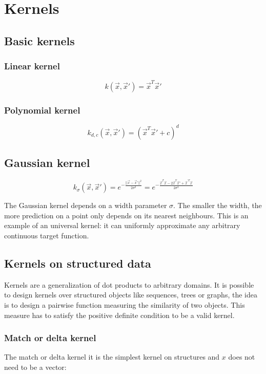 \section{Kernels}

	\subsection{Basic kernels}

		\subsubsection{Linear kernel}

		$$k(\vec{x},\vec{x}') = \vec{x}^T\vec{x}'$$

		\subsubsection{Polynomial kernel}

		$$k_{d,c}(\vec{x},\vec{x}') = (\vec{x}^T\vec{x}'+c)^d$$

	\subsection{Gaussian kernel}

	$$k_\sigma(\vec{x},\vec{x}') = e^{-\frac{||\vec{x}-\vec{x}'||^2}{2\sigma^2}} = e^{-\frac{\vec{x}^T\vec{x}-2\vec{x}^T\vec{x}' +\vec{x}^{'T}\vec{x}}{2\sigma^2}}$$

	The Gaussian kernel depends on a width parameter $\sigma$.
	The smaller the width, the more prediction on a point only depends on its nearest neighbours.
	This is an example of an universal kernel: it can uniformly approximate any arbitrary continuous target function.

	\subsection{Kernels on structured data}
	Kernels are a generalization of dot products to arbitrary domains.
	It is possible to design kernels over structured objects like sequences, trees or graphs, the idea is to design a pairwise function measuring the similarity of two objects.
	This measure has to satisfy the positive definite condition to be a valid kernel.

		\subsubsection{Match or delta kernel}
		The match or delta kernel it is the simplest kernel on structures and $x$ does not need to be a vector:

